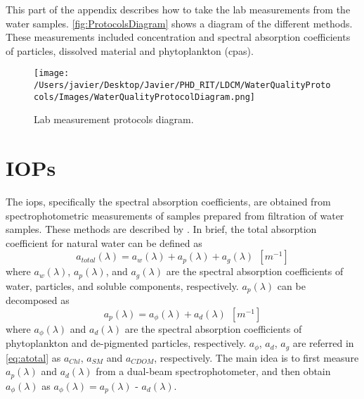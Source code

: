 \begin{appendices}
This part of the appendix describes how to take the lab measurements from the water samples. \autoref{fig:ProtocolsDiagram} shows a diagram of the different methods. These measurements included concentration and spectral absorption coefficients of particles, dissolved material and phytoplankton (\gls{cpas}).


\begin{figure}[htb]
\centering
    \texttt{[image: /Users/javier/Desktop/Javier/PHD\_RIT/LDCM/WaterQualityProtocols/Images/WaterQualityProtocolDiagram.png]}%
    \vspace{0.5cm}
   \caption[]{\label{fig:ProtocolsDiagram} Lab measurement protocols diagram.}
\end{figure}

\section{IOPs}
The \gls{iops}, specifically the spectral absorption coefficients, are obtained from spectrophotometric measurements of samples prepared from filtration of water samples. These methods are described by \citet{Mitchell2002}. In brief, the total absorption coefficient for natural water can be defined as \citep{Mitchell2002}
\begin{equation}
  a_{total}(\lambda) = a_w(\lambda) + a_p(\lambda) + a_g(\lambda)~~[m^{-1}] 
\end{equation}
\noindent where $a_w(\lambda)$, $a_p(\lambda)$, and $a_g(\lambda)$ are the spectral absorption coefficients of water, particles, and soluble components, respectively. $a_p(\lambda)$ can be decomposed as
\begin{equation}
  a_p(\lambda) = a_\phi(\lambda) + a_d(\lambda)~~[m^{-1}] 
\end{equation}
\noindent where $a_\phi(\lambda)$ and $a_d(\lambda)$ are the spectral absorption coefficients of phytoplankton and de-pigmented particles, respectively. $a_\phi$, $a_d$, $a_g$ are referred in \autoref{eq:atotal} as $a_{Chl}$, $a_{SM}$ and $a_{CDOM}$, respectively. The main idea is to first measure $a_p(\lambda)$ and $a_d(\lambda)$ from a dual-beam spectrophotometer, and then obtain $a_\phi(\lambda)$ as $a_\phi(\lambda)=a_p(\lambda)$ - $a_d(\lambda)$.


\end{appendices}

